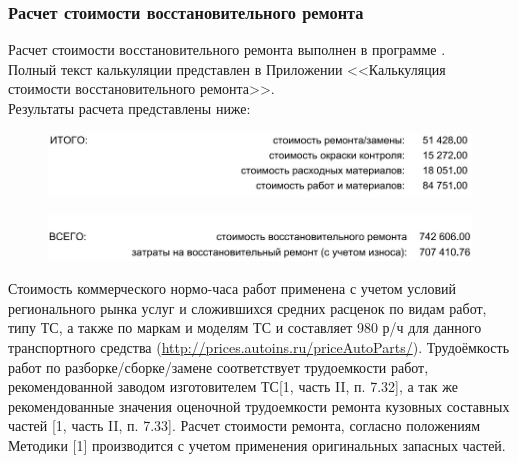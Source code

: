 \subsubsection*{Расчет стоимости восстановительного ремонта}
\par Расчет стоимости восстановительного ремонта выполнен в программе \auda.\\
Полный текст калькуляции представлен в Приложении  <<Калькуляция стоимости восстановительного ремонта>>.\\ 
\indent Результаты расчета представлены ниже:
%
\begin{figure}[H]
	\centering
	\includegraphics[width=0.95\linewidth]{images/Screenshot_1}
\end{figure}
\begin{figure}[H]
	\centering
	\includegraphics[width=0.95\linewidth]{images/Screenshot_2}
\end{figure}
\medskip
\renewcommand\baselinestretch{1.2}\small\normalsize
Стоимость коммерческого нормо-часа работ применена  с учетом условий регионального рынка услуг и сложившихся средних расценок по видам работ, типу ТС, а также по маркам и моделям ТС  и   составляет 980 р/ч для данного транспортного средства (\url{http://prices.autoins.ru/priceAutoParts/}). Трудоёмкость работ по разборке/сборке/замене  соответствует трудоемкости работ, рекомендованной заводом изготовителем ТС[1, часть II, п. 7.32], а так же рекомендованные значения оценочной трудоемкости ремонта кузовных составных частей [1, часть II, п. 7.33]. Расчет стоимости ремонта, согласно положениям Методики [1] производится с учетом  применения оригинальных запасных частей. %
